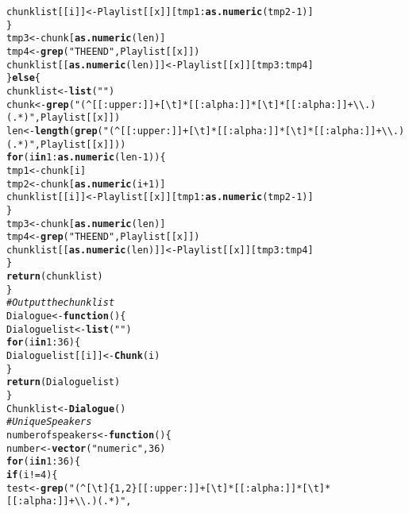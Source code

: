 \documentclass{article}\usepackage[]{graphicx}\usepackage[]{color}
\makeatletter
\newcommand{\hlnum}[1]{\textcolor[rgb]{0.686,0.059,0.569}{#1}}%
\newcommand{\hlstr}[1]{\textcolor[rgb]{0.192,0.494,0.8}{#1}}%
\newcommand{\hlcom}[1]{\textcolor[rgb]{0.678,0.584,0.686}{\textit{#1}}}%
\newcommand{\hlopt}[1]{\textcolor[rgb]{0,0,0}{#1}}%
\newcommand{\hlstd}[1]{\textcolor[rgb]{0.345,0.345,0.345}{#1}}%
\newcommand{\hlkwa}[1]{\textcolor[rgb]{0.161,0.373,0.58}{\textbf{#1}}}%
\newcommand{\hlkwb}[1]{\textcolor[rgb]{0.69,0.353,0.396}{#1}}%
\newcommand{\hlkwd}[1]{\textcolor[rgb]{0.737,0.353,0.396}{\textbf{#1}}}%
\newenvironment{kframe}{%
 \def\at@end@of@kframe{}%
 \ifinner\ifhmode%
  \def\at@end@of@kframe{\end{minipage}}%
  \begin{minipage}{\columnwidth}%
 \fi\fi%
 \def\FrameCommand##1{\hskip\@totalleftmargin \hskip-\fboxsep
 \colorbox{shadecolor}{##1}\hskip-\fboxsep
     \hskip-\linewidth \hskip-\@totalleftmargin \hskip\columnwidth}%
 \MakeFramed {\advance\hsize-\width
   \@totalleftmargin\z@ \linewidth\hsize
   \@setminipage}}%
 {\par\unskip\endMakeFramed%
 \at@end@of@kframe}
\newenvironment{knitrout}{}{} %
\makeatother
\begin{document}
\begin{knitrout}
\begin{kframe}
\begin{alltt}
            \hlstd{chunklist[[i]]} \hlkwb{<-} \hlstd{Playlist[[x]][tmp1}\hlopt{:}\hlkwd{as.numeric}\hlstd{(tmp2} \hlopt{-} \hlnum{1}\hlstd{)]}
        \hlstd{\}}
        \hlstd{tmp3} \hlkwb{<-} \hlstd{chunk[}\hlkwd{as.numeric}\hlstd{(len)]}
        \hlstd{tmp4} \hlkwb{<-} \hlkwd{grep}\hlstd{(}\hlstr{"THE END"}\hlstd{, Playlist[[x]])}
        \hlstd{chunklist[[}\hlkwd{as.numeric}\hlstd{(len)]]} \hlkwb{<-} \hlstd{Playlist[[x]][tmp3}\hlopt{:}\hlstd{tmp4]}
    \hlstd{\}} \hlkwa{else} \hlstd{\{}
        \hlstd{chunklist} \hlkwb{<-} \hlkwd{list}\hlstd{(}\hlstr{""}\hlstd{)}
        \hlstd{chunk} \hlkwb{<-} \hlkwd{grep}\hlstd{(}\hlstr{"(^[[:upper:]]+[ \textbackslash{}t]*[[:alpha:]]*[ \textbackslash{}t]*[[:alpha:]]+\textbackslash{}\textbackslash{}.)(.*)"}\hlstd{, Playlist[[x]])}
        \hlstd{len} \hlkwb{<-} \hlkwd{length}\hlstd{(}\hlkwd{grep}\hlstd{(}\hlstr{"(^[[:upper:]]+[ \textbackslash{}t]*[[:alpha:]]*[ \textbackslash{}t]*[[:alpha:]]+\textbackslash{}\textbackslash{}.)(.*)"}\hlstd{, Playlist[[x]]))}
        \hlkwa{for} \hlstd{(i} \hlkwa{in} \hlnum{1}\hlopt{:}\hlkwd{as.numeric}\hlstd{(len} \hlopt{-} \hlnum{1}\hlstd{)) \{}
            \hlstd{tmp1} \hlkwb{<-} \hlstd{chunk[i]}
            \hlstd{tmp2} \hlkwb{<-} \hlstd{chunk[}\hlkwd{as.numeric}\hlstd{(i} \hlopt{+} \hlnum{1}\hlstd{)]}
            \hlstd{chunklist[[i]]} \hlkwb{<-} \hlstd{Playlist[[x]][tmp1}\hlopt{:}\hlkwd{as.numeric}\hlstd{(tmp2} \hlopt{-} \hlnum{1}\hlstd{)]}
        \hlstd{\}}
        \hlstd{tmp3} \hlkwb{<-} \hlstd{chunk[}\hlkwd{as.numeric}\hlstd{(len)]}
        \hlstd{tmp4} \hlkwb{<-} \hlkwd{grep}\hlstd{(}\hlstr{"THE END"}\hlstd{, Playlist[[x]])}
        \hlstd{chunklist[[}\hlkwd{as.numeric}\hlstd{(len)]]} \hlkwb{<-} \hlstd{Playlist[[x]][tmp3}\hlopt{:}\hlstd{tmp4]}
    \hlstd{\}}
    \hlkwd{return}\hlstd{(chunklist)}
\hlstd{\}}
\hlcom{# Output the chunklist}
\hlstd{Dialogue} \hlkwb{<-} \hlkwa{function}\hlstd{() \{}
    \hlstd{Dialoguelist} \hlkwb{<-} \hlkwd{list}\hlstd{(}\hlstr{""}\hlstd{)}
    \hlkwa{for} \hlstd{(i} \hlkwa{in} \hlnum{1}\hlopt{:}\hlnum{36}\hlstd{) \{}
        \hlstd{Dialoguelist[[i]]} \hlkwb{<-} \hlkwd{Chunk}\hlstd{(i)}
    \hlstd{\}}
    \hlkwd{return}\hlstd{(Dialoguelist)}
\hlstd{\}}
\hlstd{Chunklist} \hlkwb{<-} \hlkwd{Dialogue}\hlstd{()}
\hlcom{# Unique Speakers}
\hlstd{numberofspeakers} \hlkwb{<-} \hlkwa{function}\hlstd{() \{}
    \hlstd{number} \hlkwb{<-} \hlkwd{vector}\hlstd{(}\hlstr{"numeric"}\hlstd{,} \hlnum{36}\hlstd{)}
    \hlkwa{for} \hlstd{(i} \hlkwa{in} \hlnum{1}\hlopt{:}\hlnum{36}\hlstd{) \{}
        \hlkwa{if} \hlstd{(i} \hlopt{!=} \hlnum{4}\hlstd{) \{}
            \hlstd{test} \hlkwb{<-} \hlkwd{grep}\hlstd{(}\hlstr{"(^[ \textbackslash{}t]\{1,2\}[[:upper:]]+[ \textbackslash{}t]*[[:alpha:]]*[ \textbackslash{}t]*[[:alpha:]]+\textbackslash{}\textbackslash{}.)(.*)"}\hlstd{,}

\end{alltt}
\end{kframe}
\end{knitrout}
\end{document}
